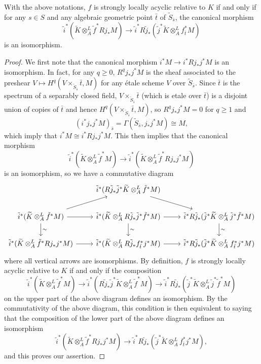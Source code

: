 \begin{lemma}\label{scheme morphism strongly locally acyclic iff complex morphism}
With the above notations, $f$ is strongly locally acyclic relative to $K$ if and only if for any $s\in S$ and any algebraic geometric point $\bar{t}$ of $\widetilde{S}_{\bar{s}}$, the canonical morphism
\[\tilde{i}^*(\widetilde{K}\otimes_A^L\tilde{f}^*Rj_*M)\to \tilde{i}^*R\tilde{j}_*(\tilde{j}^*\widetilde{K}\otimes_A^Lf_{\bar{t}}^*M)\]
is an isomorphism.
\end{lemma}
\begin{proof}
We first note that the canonical morphism $i^*M\to i^*Rj_*j^*M$ is an isomorphism. In fact, for any $q\geq 0$, $R^qj_*j^*M$ is the sheaf associated to the preshear $V\mapsto H^q(V\times_{\widetilde{S}_{\bar{s}}}\bar{t},M)$ for any \'etale scheme $V$ over $\widetilde{S}_{\bar{s}}$. Since $\bar{t}$ is the spectrum of a separably closed field, $V\times_{\widetilde{S}_{\bar{s}}}\bar{t}$ (which is etale over $\bar{t}$) is a disjoint union of copies of $\bar{t}$ and hence $H^q(V\times_{\widetilde{S}_{\bar{s}}}\bar{t},M)$, so $R^qj_*j^*M=0$ for $q\geq 1$ and
\[(i^*j_*j^*M)_{\bar{s}}=\Gamma(\widetilde{S}_{\bar{s}},j_*j^*M)\cong M,\]
which imply that $i^*M\cong i^*Rj_*j^*M$. This then implies that the canonical morphism
\[\tilde{i}^*(\widetilde{K}\otimes_A^L\tilde{f}^*M)\to\tilde{i}^*(\widetilde{K}\otimes_A^L\tilde{f}^*Rj_*j^*M)\]
is an isomorphism, so we have a commutative diagram
\[\begin{tikzcd}
&\tilde{i}^*(R\tilde{j}_*\tilde{j}^*\widetilde{K}\otimes_A^L\tilde{f}^*M)\ar[rd]\\
\tilde{i}^*(\widetilde{K}\otimes_A^L\tilde{f}^*M)\ar[r]\ar[d,"\sim"]\ar[ru]&\tilde{i}^*(\widetilde{K}\otimes_A^LR\tilde{j}_*\tilde{j}^*\tilde{f}^*M)\ar[r]\ar[d,"\sim"]&\tilde{i}^*R\tilde{j}_*(\tilde{j}^*\widetilde{K}\otimes_A^L\tilde{j}^*\tilde{f}^*M)\ar[d,"\sim"]\\
\tilde{i}^*(\widetilde{K}\otimes_A^L\tilde{f}^*Rj_*j^*M)\ar[r]&\tilde{i}^*(\widetilde{K}\otimes_A^LR\tilde{j}_*f_{\bar{t}}^*j^*M)\ar[r]&\tilde{i}^*R\tilde{j}_*(\tilde{j}^*\widetilde{K}\otimes_A^Lf_{\bar{t}}^*j^*M)
\end{tikzcd}\]
where all vertical arrows are isomorphisms. By definition, $f$ is strongly
locally acyclic relative to $K$ if and only if the composition
\[\tilde{i}^*(\widetilde{K}\otimes_A^L\tilde{f}^*M)\to\tilde{i}^*(R\tilde{j}_*\tilde{j}^*\widetilde{K}\otimes_A^L\tilde{f}^*M)\to\tilde{i}^*R\tilde{j}_*(\tilde{j}^*\widetilde{K}\otimes_A^L\tilde{j}^*\tilde{f}^*M)\]
on the upper part of the above diagram defines an isomorphism. By the commutativity of the above diagram, this condition is then equivalent to
saying that the composition of the lower part of the above diagram defines an isomorphism
\[\tilde{i}^*(\widetilde{K}\otimes_A^L\tilde{f}^*Rj_*j^*M)\to \tilde{i}^*R\tilde{j}_*(\tilde{j}^*\widetilde{K}\otimes_A^Lf_{\bar{t}}^*j^*M),\]
and this proves our assertion.
\end{proof}

